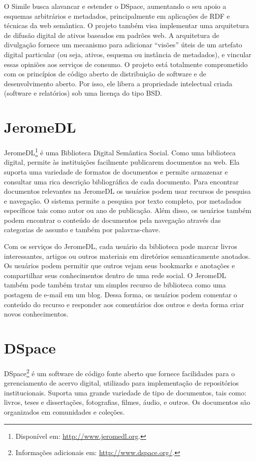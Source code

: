 O Simile busca alavancar e estender o DSpace, aumentando o seu apoio a esquemas arbitrários e metadados, principalmente em aplicações de RDF e técnicas da web semântica. O projeto também visa implementar uma arquitetura de difusão digital de ativos baseados em padrões web. A arquitetura de divulgação fornece um mecanismo para adicionar “visões” úteis de um artefato digital particular (ou seja, ativos, esquema ou instância de metadados), e vincular essas opiniões aos serviços de consumo. O projeto está totalmente comprometido com os princípios de código aberto de distribuição de software e de desenvolvimento aberto. Por isso, ele libera a propriedade intelectual criada (software e relatórios) sob uma licença do tipo BSD.
 
\section*{JeromeDL}

JeromeDL\footnote{Disponível em: \url{http://www.jeromedl.org}.}  é uma Biblioteca Digital Semântica Social. Como uma biblioteca digital, permite às instituições facilmente publicarem documentos na web. Ela suporta uma variedade de formatos de documentos e permite armazenar e consultar uma rica descrição bibliográfica de cada documento. Para encontrar documentos relevantes na JeromeDL os usuários podem usar recursos de pesquisa e navegação. O sistema permite a pesquisa por texto completo, por metadados específicos tais como autor ou ano de publicação. Além disso, os usuários também podem encontrar o conteúdo de documentos pela navegação através das categorias de assunto e também por palavras-chave.

Com os serviços do JeromeDL, cada usuário da biblioteca pode marcar livros interessantes, artigos ou outros materiais em diretórios semanticamente anotados. Os usuários podem permitir que outros vejam seus bookmarks e anotações e compartilhar seus conhecimentos dentro de uma rede social. O JeromeDL também pode também tratar um simples recurso de biblioteca como uma postagem de e-mail em um blog. Dessa forma, os usuários podem comentar o conteúdo do recurso e responder aos comentários dos outros e desta forma criar novos conhecimentos.

\section*{DSpace}

DSpace\footnote{Informações adicionais em: \url{http://www.dspace.org/}.} é um software de código fonte aberto que fornece facilidades para o gerenciamento de acervo digital, utilizado para implementação de repositórios institucionais. Suporta uma grande variedade de tipo de documentos, tais como: livros, teses e dissertações, fotografias, filmes, áudio, e outros. Os documentos são organizados em comunidades e coleções.

